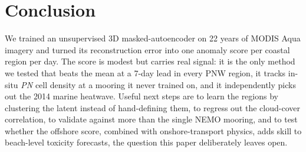 \documentclass[10pt,twocolumn,letterpaper]{article}
\begin{document}
\section{Conclusion}
\label{sec:conclusion}

We trained an unsupervised 3D masked-autoencoder on 22 years of MODIS Aqua imagery and turned its reconstruction error into one anomaly score per coastal region per day. The score is modest but carries real signal: it is the only method we tested that beats the mean at a 7-day lead in every PNW region, it tracks in-situ \textit{PN} cell density at a mooring it never trained on, and it independently picks out the 2014 marine heatwave. Useful next steps are to learn the regions by clustering the latent instead of hand-defining them, to regress out the cloud-cover correlation, to validate against more than the single NEMO mooring, and to test whether the offshore score, combined with onshore-transport physics, adds skill to beach-level toxicity forecasts, the question this paper deliberately leaves open.


{\small


}
\end{document}

